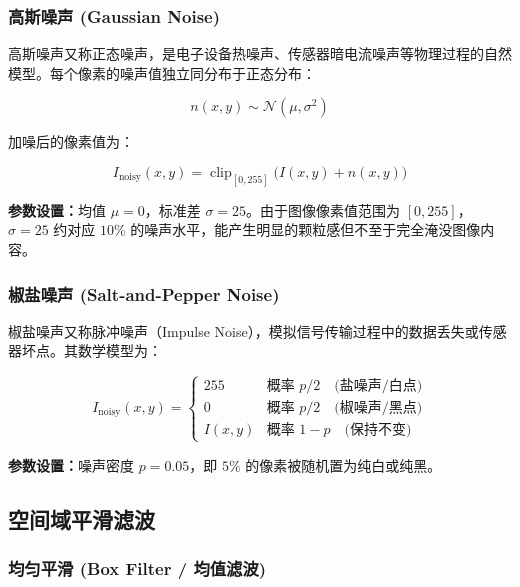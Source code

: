 \documentclass[12pt,a4paper]{ctexart}
\begin{document}
\subsubsection{高斯噪声 (Gaussian Noise)}

高斯噪声又称正态噪声，是电子设备热噪声、传感器暗电流噪声等物理过程的自然模型。每个像素的噪声值独立同分布于正态分布：

\begin{equation}
    n(x,y) \sim \mathcal{N}(\mu, \sigma^2)
    \label{eq:gauss_noise}
\end{equation}

加噪后的像素值为：

\begin{equation}
    I_{\text{noisy}}(x,y) = \operatorname{clip}_{[0,255]}\Big(I(x,y) + n(x,y)\Big)
    \label{eq:gauss_noisy}
\end{equation}

\textbf{参数设置：}均值 $\mu = 0$，标准差 $\sigma = 25$。由于图像像素值范围为 $[0,255]$，$\sigma=25$ 约对应 $10\%$ 的噪声水平，能产生明显的颗粒感但不至于完全淹没图像内容。

\subsubsection{椒盐噪声 (Salt-and-Pepper Noise)}

椒盐噪声又称脉冲噪声（Impulse Noise），模拟信号传输过程中的数据丢失或传感器坏点。其数学模型为：

\begin{equation}
    I_{\text{noisy}}(x,y) =
    \begin{cases}
        255 & \text{概率 } p/2 \quad \text{(盐噪声/白点)} \\
        0   & \text{概率 } p/2 \quad \text{(椒噪声/黑点)} \\
        I(x,y) & \text{概率 } 1-p \quad \text{(保持不变)}
    \end{cases}
    \label{eq:sp_noise}
\end{equation}

\textbf{参数设置：}噪声密度 $p = 0.05$，即 $5\%$ 的像素被随机置为纯白或纯黑。

\subsection{空间域平滑滤波}

\subsubsection{均匀平滑 (Box Filter / 均值滤波)}
\end{document}
